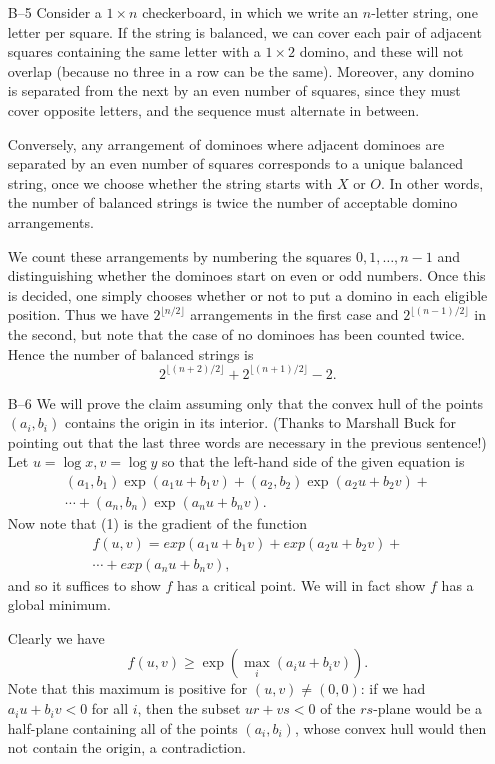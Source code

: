 \documentclass[amssymb,twocolumn,pra,10pt,aps]{revtex4-1}
\begin{document}
\begin{itemize}
\item[B--5]
Consider a $1 \times n$ checkerboard, in which we write an $n$-letter
string, one letter per square. If the string is balanced, we can cover
each pair of adjacent squares containing the same letter with a $1
\times 2$ domino, and these will not overlap (because no three in a
row can be the same). Moreover, any domino is separated from the next
by an even number of squares, since they must cover opposite letters,
and the sequence must alternate in between.

Conversely, any arrangement of dominoes where adjacent dominoes are
separated by an even number of squares corresponds to a unique
balanced string, once we choose whether the string starts with $X$ or
$O$. In other words, the number of balanced strings is twice the
number of acceptable domino arrangements.

We count these arrangements by numbering the squares $0,1,\dots,n-1$
and distinguishing whether the dominoes start on even or odd numbers.
Once this is decided, one simply chooses whether or not to put a
domino in each eligible position. Thus
we have $2^{\lfloor n/2 \rfloor}$ arrangements in the first case and $2^{\lfloor
(n-1)/2 \rfloor}$ in the second, but note that the case of no dominoes has
been counted twice. Hence the number of balanced strings is
\[
2^{\lfloor (n+2)/2 \rfloor} + 2^{\lfloor (n+1)/2 \rfloor} - 2.
\]

\item[B--6]
We will prove the claim assuming only that the convex hull of the
points $(a_{i}, b_{i})$ contains the origin in its interior. (Thanks
to Marshall Buck for pointing out that the last three words are
necessary in the previous sentence!) Let $u = \log x, v = \log
y$ so that the left-hand side of the given equation is
\begin{multline}
(a_1, b_1) \exp(a_1 u + b_1 v) + (a_2, b_2) \exp(a_2 u + b_2 v) + \\
\cdots + (a_n, b_n) \exp(a_n u + b_n v).
\end{multline}
Now note that (1) is the gradient of the function
\begin{gather*}
f(u,v) = exp(a_1 u + b_1 v) +
exp(a_2 u + b_2 v) + \\
\cdots + exp(a_n u + b_n v),
\end{gather*}
and so it suffices to show $f$ has a critical point. We will in fact
show $f$ has a global minimum.

Clearly we have
\[
f(u,v) \geq \exp\left( \max_i (a_i u + b_i v) \right).
\]
Note that this maximum is positive for $(u,v) \neq (0,0)$:  if we had
$a_i u + b_i v < 0$ for all $i$, then the subset $ur + vs < 0$ of the
$rs$-plane would be a half-plane containing all of the points $(a_i,
b_i)$, whose convex hull would then not contain the origin, a
contradiction.


\end{itemize}
\end{document}
